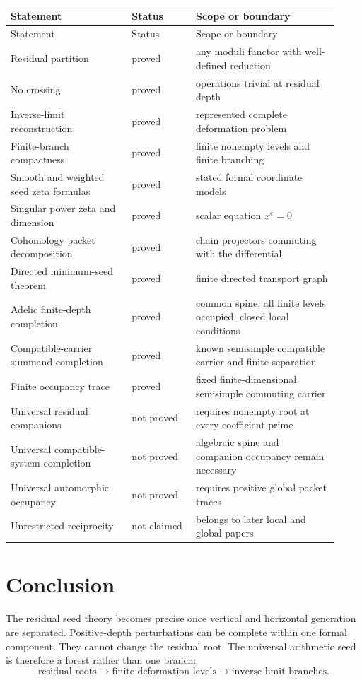 \documentclass[11pt]{article}
\theoremstyle{definition}
\theoremstyle{remark}
\begin{document}
\begin{longtable}{p{0.34\linewidth}p{0.18\linewidth}p{0.40\linewidth}}
\toprule
Statement & Status & Scope or boundary\\
\midrule
\endfirsthead
\toprule
Statement & Status & Scope or boundary\\
\midrule
\endhead
Residual partition & proved & any moduli functor with well-defined reduction\\
No crossing & proved & operations trivial at residual depth\\
Inverse-limit reconstruction & proved & represented complete deformation problem\\
Finite-branch compactness & proved & finite nonempty levels and finite branching\\
Smooth and weighted seed zeta formulas & proved & stated formal coordinate models\\
Singular power zeta and dimension & proved & scalar equation \(x^e=0\)\\
Cohomology packet decomposition & proved & chain projectors commuting with the differential\\
Directed minimum-seed theorem & proved & finite directed transport graph\\
Adelic finite-depth completion & proved & common spine, all finite levels occupied, closed local conditions\\
Compatible-carrier summand completion & proved & known semisimple compatible carrier and finite separation\\
Finite occupancy trace & proved & fixed finite-dimensional semisimple commuting carrier\\
Universal residual companions & not proved & requires nonempty root at every coefficient prime\\
Universal compatible-system completion & not proved & algebraic spine and companion occupancy remain necessary\\
Universal automorphic occupancy & not proved & requires positive global packet traces\\
Unrestricted reciprocity & not claimed & belongs to later local and global papers\\
\bottomrule
\end{longtable}

\section{Conclusion}

The residual seed theory becomes precise once vertical and horizontal generation are separated.  Positive-depth perturbations can be complete within one formal component.  They cannot change the residual root.  The universal arithmetic seed is therefore a forest rather than one branch:
\[
\boxed{
\text{residual roots}
\longrightarrow
\text{finite deformation levels}
\longrightarrow
\text{inverse-limit branches}.
}
\]
\end{document}

